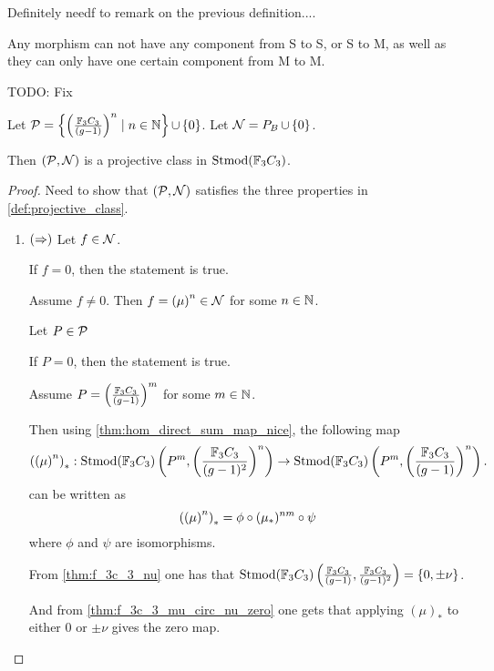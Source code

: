 \begin{remark}
    Definitely needf to remark on the previous definition.... 
    
    Any morphism can not have any component from S to S, or S to M, as well as they can only have one certain component from M to M.

    TODO: Fix
\end{remark}

\begin{theorem} %
    Let \( {\mathcal{P}} = \left\{ \left( \frac{{\mathbb{F}}_3C_3}{(g - 1)} \right)^n \mid n \in {\mathbb{N}} \right\} \mathop{\cup}\limits \left\{ 0 \right\} \). Let \( {\mathcal{N}} = P_B \mathop{\cup}\limits \left\{ 0 \right\} \).

    Then \( \left( {\mathcal{P}}, {\mathcal{N}}\right) \) is a projective class in \( \operatorname{Stmod}({\mathbb{F}}_3C_3) \).
\end{theorem}
\begin{proof}
    Need to show that \( \left( {\mathcal{P}}, {\mathcal{N}} \right) \) satisfies the three properties in \autoref{def:projective_class}.

    \begin{enumerate}
        \item {
            \( \left( \Rightarrow \right) \) Let \( f \in {\mathcal{N}} \).

            If \( f = 0 \), then the statement is true.

            Assume \( f \neq 0 \). Then \( f = \left( \mu \right)^n \in {\mathcal{N}} \) for some \( n \in {\mathbb{N}} \).
            
            Let \( P \in {\mathcal{P}} \)
            
            If \( P = 0 \), then the statement is true.

            Assume \( P = \left( \frac{{\mathbb{F}}_3C_3}{(g - 1)} \right)^m \) for some \( m \in {\mathbb{N}} \).

            Then using \autoref{thm:hom_direct_sum_map_nice}, the following map
            \[
                \left( \left( \mu \right)^n \right)_* : \operatorname{Stmod}({\mathbb{F}}_3C_3)\left(P^m, \left(\frac{{\mathbb{F}}_3C_3}{(g - 1)^2}\right)^n \right) \to \operatorname{Stmod}({\mathbb{F}}_3C_3)\left(P^m, \left(\frac{{\mathbb{F}}_3C_3}{(g - 1)}\right)^n \right).
            \]
            can be written as
            \[
                \left( \left( \mu \right)^n \right)_* = \phi \circ (\mu_*)^{nm} \circ \psi
            \]
            where \( \phi \) and \( \psi \) are isomorphisms.

            From \autoref{thm:f_3c_3_nu} one has that \( \operatorname{Stmod}({\mathbb{F}}_3C_3)\left( \frac{{\mathbb{F}}_3C_3}{(g - 1)}, \frac{{\mathbb{F}}_3C_3}{(g - 1)^2} \right) = \left\{ 0, \pm \nu \right\} \).

            And from \autoref{thm:f_3c_3_mu_circ_nu_zero} one gets that applying \( (\mu)_* \) to either \( 0 \) or \( \pm \nu \) gives the zero map.

}
\end{enumerate}
\end{proof}
